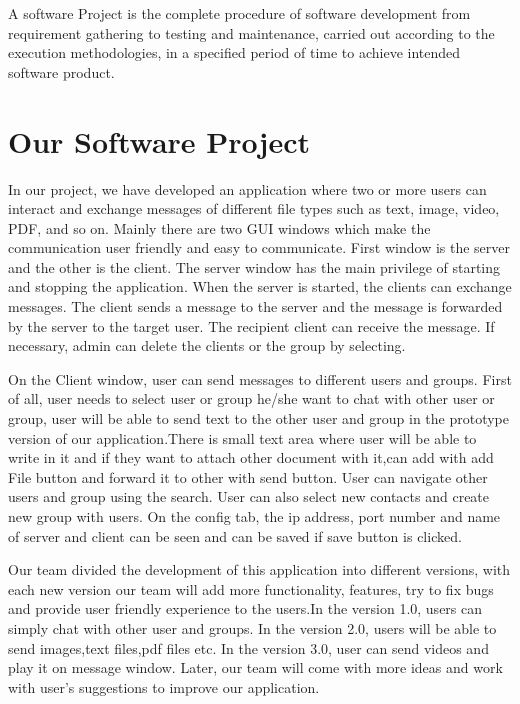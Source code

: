     A software Project is the complete procedure of software development from requirement gathering
    to testing and maintenance, carried out according to the execution methodologies,
    in a specified period of time to achieve intended software product.

   \section{Our Software  Project}\label{sec:our-software--project}
    In our project, we have developed an application where two or more users can interact and
    exchange messages of different file types such as text, image, video, PDF, and so on.
    Mainly there are two GUI windows which make the communication user friendly and easy to
    communicate.
    First window is the server and the other is the client.
    The server window has the main privilege of starting and stopping the application.
    When the server is started, the clients can exchange messages.
    The client sends a message to the server and the message is forwarded by the server to the
    target user.
    The recipient client can receive the message.
    If necessary, admin can delete the clients or the group by selecting.
    \medskip
    
    \noindent
    On the Client window, user can send messages to different users and groups.
    First of all, user needs to select user or group he/she want to chat with other user or group,
    user will be able to send text to the other user and group in the prototype version of our
    application.There is small text area where user will be able to write in it and if they want
    to attach other document with it,can add with add File button and forward it to other with send
    button.
    User can navigate other users and group using the search.
    User can also select new contacts and create new group with users.
    On the config tab, the ip address, port number and name of server and client can be seen and
    can be saved if save button is clicked.
    \medskip
   
    \noindent
    Our team divided the development of this application into different versions, with each new
    version our team will add more functionality, features, try to fix bugs and provide user
    friendly experience to the users.In the version 1.0, users can simply chat with other user
    and groups.
    In the version 2.0, users will be able to send images,text files,pdf files etc.
    In the version 3.0, user can send videos and play it on message window.
    Later, our team will come with more ideas and work with user's suggestions to improve our
    application.
    \medskip

